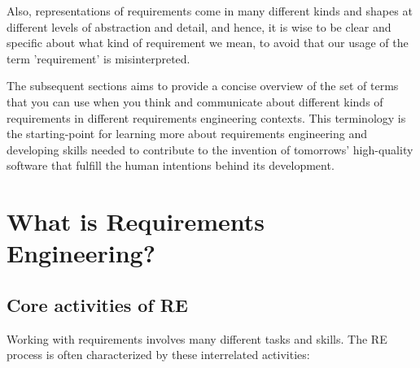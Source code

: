 Also, representations of requirements come in many different kinds and shapes at different levels of abstraction and detail, and hence, it is wise to be clear and specific about what kind of requirement we mean, to avoid that our usage of the term 'requirement' is misinterpreted. 


The subsequent sections aims to provide a concise overview of the set of terms that you can use when you think and communicate about different kinds of requirements in different requirements engineering contexts. This terminology is the starting-point for learning more about requirements engineering and developing skills needed to contribute to the invention of tomorrows' high-quality software that fulfill the human intentions behind its development.

\section{What is Requirements Engineering?}%
\subsection{Core activities of RE}%
\MarginPage{



}%
Working with requirements involves many different tasks and skills. The RE process is often characterized by these interrelated activities: 

